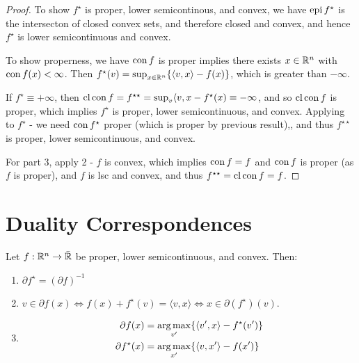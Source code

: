\begin{proof}
  To show $f^{\star}$ is proper, lower semicontinous, and convex, we
  have $\operatorname*{epi} f^{\star}$ is the intersecton of closed convex sets, and
  therefore closed and convex, and hence $f^{\star}$ is lower
  semicontinuous and convex.

  To show properness, we have $\operatorname*{con} f$ is proper implies there exists
  $x \in \mathbb{R}^{n}$ with $\operatorname*{con} f(x) < \infty$. Then $f^{\star}(v) =
  \sup_{x \in \mathbb{R}^{n}} \{ \langle v, x \rangle - f(x) \}$, which is
  greater than $-\infty$.

  If $f^{\star} \equiv +\infty$, then $\operatorname*{cl} \operatorname*{con} f = f^{\star \star} =
  \sup_{v} \langle v, x - f^{\star}(x) \equiv -\infty$, and so $\operatorname*{cl}
  \operatorname*{con} f$ is proper, which implies $f^{\star}$ is proper, lower
  semicontinuous, and convex. Applying to $f^{\star}$ - we need $\operatorname*{con}
  f^{\star}$ proper (which is proper by previous result),, and thus
  $f^{\star \star}$ is proper, lower semicontinuous, and convex.

  For part 3, apply 2 - $f$ is convex, which implies $\operatorname*{con} f = f$ and
  $\operatorname*{con} f$ is proper (as $f$ is proper), and $f$ is lsc and convex,
  and thus $f^{\star \star} = \operatorname*{cl} \operatorname*{con} f = f$.
\end{proof}


\section{Duality Correspondences}
\label{sec:dual-corr}

\begin{thm}
  \label{defn:conjugate_functions:7}
  Let $f: \mathbb{R}^{n} \rightarrow \bar {\mathbb{R}}$ be proper, lower semicontinuous,
  and convex. Then:
  \begin{enumerate}
  \item $\partial f^{\star} = (\partial f)^{-1}$
  \item $v \in \partial f(x) \iff f(x) + f^{\star}(v) = \langle v, x
    \rangle \iff x \in \partial (f^{\star})(v)$.
  \item
    \begin{align}
      \label{eq:58}
      \partial f(x) &= \operatorname*{arg\,max}_{v'} \{ \langle v', x \rangle - f^{\star}(v') \}  \\
      \partial f^{\star}(x) &= \operatorname*{arg\,max}_{x'} \{ \langle v, x' \rangle - f(x') \}  \\
    \end{align}

  \end{enumerate}
\end{thm}

